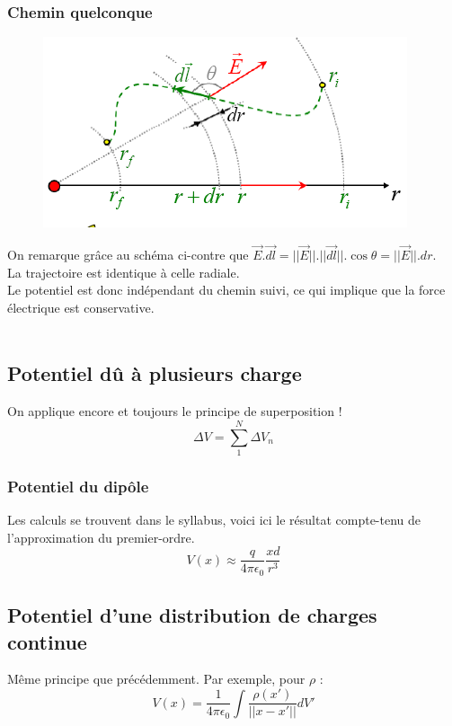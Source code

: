 \documentclass	[11pt, a4paper, openany]{book}
\begin{document}
\subsubsection{Chemin quelconque}
\begin{figure}
\includegraphics[scale=0.44]{es/image10.png}
\end{figure}
On remarque grâce au schéma ci-contre que $\vec{E}.\vec{dl} = ||\vec{E}||.||\vec{dl}||.\cos\theta = ||\vec{E}||.dr$.\\
La trajectoire est identique à celle radiale.\\

Le potentiel est donc indépendant du chemin suivi, ce qui implique que la force électrique est conservative.\\
\ \\

\subsection{Potentiel dû à plusieurs charge}
On applique encore et toujours le principe de superposition !
\begin{equation}
\Delta V = \sum_1^N \Delta V_n
\end{equation} 

\subsubsection{Potentiel du dipôle}
Les calculs se trouvent dans le syllabus, voici ici le résultat compte-tenu de l'approximation du premier-ordre.
\begin{equation}
V(x) \approx \frac{q}{4\pi \epsilon_0}\frac{xd}{r^3}
\end{equation}

\subsection{Potentiel d'une distribution de charges continue}
Même principe que précédemment. Par exemple, pour $\rho$ :
\begin{equation}
V(x) = \frac{1}{4\pi \epsilon_0}\int\frac{\rho (x')}{||x-x'||}dV'
\end{equation}
\end{document}
